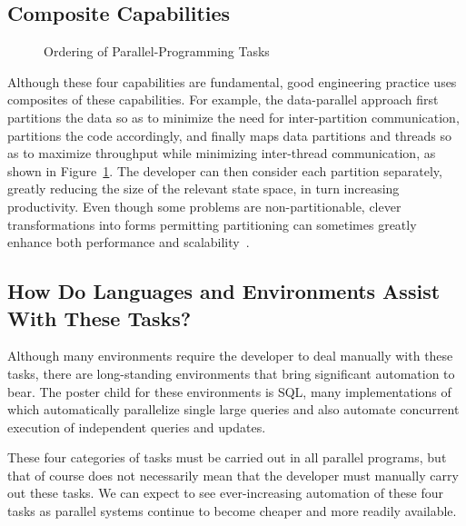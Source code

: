 \subsection{Composite Capabilities}
\label{sec:Composite Capabilities}

\begin{figure}[tb]
\centering
{}
\caption{Ordering of Parallel-Programming Tasks}
\label{fig:intro:Ordering of Parallel-Programming Tasks}
\end{figure}

Although these four capabilities are fundamental,
good engineering practice uses composites of
these capabilities.
For example, the data-parallel approach first
partitions the data so as to minimize the need for
inter-partition communication, partitions the code accordingly,
and finally maps data partitions and threads so as to maximize
throughput while minimizing inter-thread communication,
as shown in
Figure~\ref{fig:intro:Ordering of Parallel-Programming Tasks}.
The developer can then
consider each partition separately, greatly reducing the size
of the relevant state space, in turn increasing productivity.
Even though some problems are non-partitionable,
clever transformations into forms permitting partitioning can
sometimes greatly enhance
both performance and scalability~\cite{PanagiotisMetaxas1999PDCS}.

\subsection{How Do Languages and Environments Assist With These Tasks?}
\label{sec:intro:How Do Languages and Environments Assist With These Tasks?}

Although many environments require the developer to deal manually
with these tasks, there are long-standing environments that bring
significant automation to bear.
The poster child for these environments is SQL, many implementations
of which automatically parallelize single large queries and also
automate concurrent execution of independent queries and updates.

These four categories of tasks must be carried out in all parallel
programs, but that of course does not necessarily mean that the developer
must manually carry out these tasks.
We can expect to see ever-increasing automation of these four tasks
as parallel systems continue to become cheaper and more readily available.

